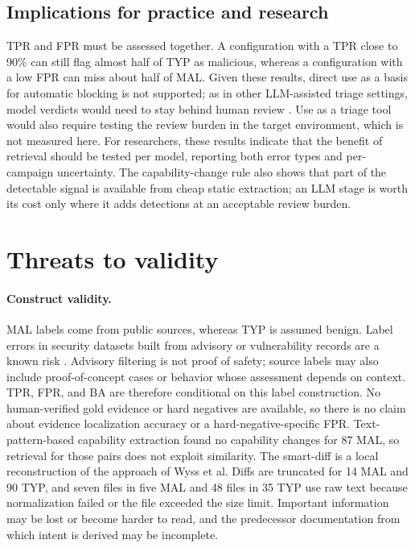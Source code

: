\documentclass[a4paper,fleqn]{cas-dc}
\begin{document}
\subsection{Implications for practice and research}
TPR and FPR must be assessed together. A configuration with a TPR close to 90\%
can still flag almost half of TYP as malicious, whereas a configuration with a low
FPR can miss about half of MAL. Given these results, direct use as a basis for automatic blocking is not supported; as in other LLM-assisted triage settings, model verdicts would need to stay behind human review \citep{malhotra2027llm}. Use as a triage tool would also require
testing the review burden in the target environment, which is not measured here.
For researchers, these results indicate that the benefit of retrieval should be
tested per model, reporting both error types and per-campaign uncertainty. The capability-change rule also shows that part of the detectable signal is
available from cheap static extraction; an LLM stage is worth its cost only where
it adds detections at an acceptable review burden.

\section{Threats to validity}\label{sec:limitations}
\paragraph{Construct validity.}
MAL labels come from public sources, whereas TYP is assumed benign. Label errors
in security datasets built from advisory or vulnerability records are a known
risk \citep{wu2020cve}. Advisory
filtering is not proof of safety; source labels may also include proof-of-concept
cases or behavior whose assessment depends on context. TPR, FPR, and BA are
therefore conditional on this label construction. No human-verified gold evidence
or hard negatives are available, so there is no claim about evidence localization
accuracy or a hard-negative-specific FPR. Text-pattern-based capability extraction
found no capability changes for 87 MAL, so retrieval for those pairs does not
exploit similarity. The smart-diff is a local reconstruction of the approach of
Wyss et al. Diffs are truncated for 14 MAL and 90 TYP, and seven files in five MAL
and 48 files in 35 TYP use raw text because normalization failed or the file
exceeded the size limit. Important information may be lost or become harder to
read, and the predecessor documentation from which intent is derived may be
incomplete.
\end{document}
